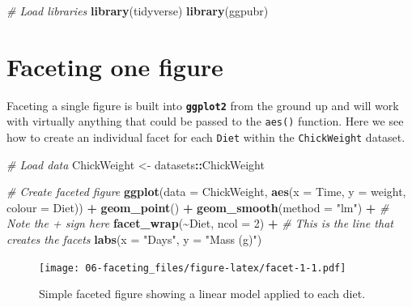 \documentclass[
]{book}
\newenvironment{Shaded}{\begin{snugshade}}{\end{snugshade}}
\newcommand{\CommentTok}[1]{\textcolor[rgb]{0.56,0.35,0.01}{\textit{#1}}}
\newcommand{\DataTypeTok}[1]{\textcolor[rgb]{0.13,0.29,0.53}{#1}}
\newcommand{\DecValTok}[1]{\textcolor[rgb]{0.00,0.00,0.81}{#1}}
\newcommand{\KeywordTok}[1]{\textcolor[rgb]{0.13,0.29,0.53}{\textbf{#1}}}
\newcommand{\NormalTok}[1]{#1}
\newcommand{\OperatorTok}[1]{\textcolor[rgb]{0.81,0.36,0.00}{\textbf{#1}}}
\newcommand{\StringTok}[1]{\textcolor[rgb]{0.31,0.60,0.02}{#1}}
\begin{document}
\begin{Shaded}
\begin{Highlighting}[]
\CommentTok{\# Load libraries}
\KeywordTok{library}\NormalTok{(tidyverse)}
\KeywordTok{library}\NormalTok{(ggpubr)}
\end{Highlighting}
\end{Shaded}

\hypertarget{faceting-one-figure}{%
\section{Faceting one figure}\label{faceting-one-figure}}

Faceting a single figure is built into \textbf{\texttt{ggplot2}} from the ground up and will work with virtually anything that could be passed to the \texttt{aes()} function. Here we see how to create an individual facet for each \texttt{Diet} within the \texttt{ChickWeight} dataset.

\begin{Shaded}
\begin{Highlighting}[]
\CommentTok{\# Load data}
\NormalTok{ChickWeight <{-}}\StringTok{ }\NormalTok{datasets}\OperatorTok{::}\NormalTok{ChickWeight}

\CommentTok{\# Create faceted figure}
\KeywordTok{ggplot}\NormalTok{(}\DataTypeTok{data =}\NormalTok{ ChickWeight, }\KeywordTok{aes}\NormalTok{(}\DataTypeTok{x =}\NormalTok{ Time, }\DataTypeTok{y =}\NormalTok{ weight, }\DataTypeTok{colour =}\NormalTok{ Diet)) }\OperatorTok{+}
\StringTok{  }\KeywordTok{geom\_point}\NormalTok{() }\OperatorTok{+}
\StringTok{  }\KeywordTok{geom\_smooth}\NormalTok{(}\DataTypeTok{method =} \StringTok{"lm"}\NormalTok{) }\OperatorTok{+}\StringTok{ }\CommentTok{\# Note the \textasciigrave{}+\textasciigrave{} sign here}
\StringTok{  }\KeywordTok{facet\_wrap}\NormalTok{(}\OperatorTok{\textasciitilde{}}\NormalTok{Diet, }\DataTypeTok{ncol =} \DecValTok{2}\NormalTok{) }\OperatorTok{+}\StringTok{ }\CommentTok{\# This is the line that creates the facets}
\StringTok{  }\KeywordTok{labs}\NormalTok{(}\DataTypeTok{x =} \StringTok{"Days"}\NormalTok{, }\DataTypeTok{y =} \StringTok{"Mass (g)"}\NormalTok{)}
\end{Highlighting}
\end{Shaded}

\begin{figure}
\centering
\texttt{[image: 06-faceting\_files/figure-latex/facet-1-1.pdf]}
\caption{\label{fig:facet-1}Simple faceted figure showing a linear model applied to each diet.}
\end{figure}
\end{document}
